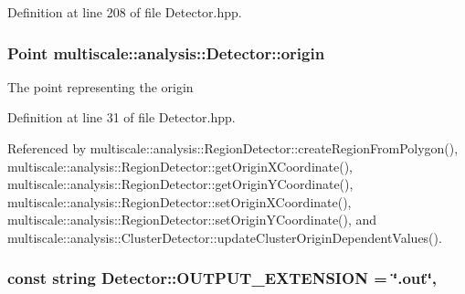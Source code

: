 Definition at line 208 of file Detector.\-hpp.

\hypertarget{classmultiscale_1_1analysis_1_1Detector_a002237e2ad684975a7c8b1e12dd7d780}{
\subsubsection[{origin}]{\setlength{\rightskip}{0pt plus 5cm}Point multiscale\-::analysis\-::\-Detector\-::origin\hspace{0.3cm}{\ttfamily [protected]}}}\label{classmultiscale_1_1analysis_1_1Detector_a002237e2ad684975a7c8b1e12dd7d780}
The point representing the origin 

Definition at line 31 of file Detector.\-hpp.



Referenced by multiscale\-::analysis\-::\-Region\-Detector\-::create\-Region\-From\-Polygon(), multiscale\-::analysis\-::\-Region\-Detector\-::get\-Origin\-X\-Coordinate(), multiscale\-::analysis\-::\-Region\-Detector\-::get\-Origin\-Y\-Coordinate(), multiscale\-::analysis\-::\-Region\-Detector\-::set\-Origin\-X\-Coordinate(), multiscale\-::analysis\-::\-Region\-Detector\-::set\-Origin\-Y\-Coordinate(), and multiscale\-::analysis\-::\-Cluster\-Detector\-::update\-Cluster\-Origin\-Dependent\-Values().

\hypertarget{classmultiscale_1_1analysis_1_1Detector_a3030def7fe61741fcc8f5c8b50f40e57}{
\subsubsection[{O\-U\-T\-P\-U\-T\-\_\-\-E\-X\-T\-E\-N\-S\-I\-O\-N}]{\setlength{\rightskip}{0pt plus 5cm}const string Detector\-::\-O\-U\-T\-P\-U\-T\-\_\-\-E\-X\-T\-E\-N\-S\-I\-O\-N = \char`\"{}.out\char`\"{}\hspace{0.3cm}{\ttfamily [static]}, {\ttfamily [protected]}}}\label{classmultiscale_1_1analysis_1_1Detector_a3030def7fe61741fcc8f5c8b50f40e57}


